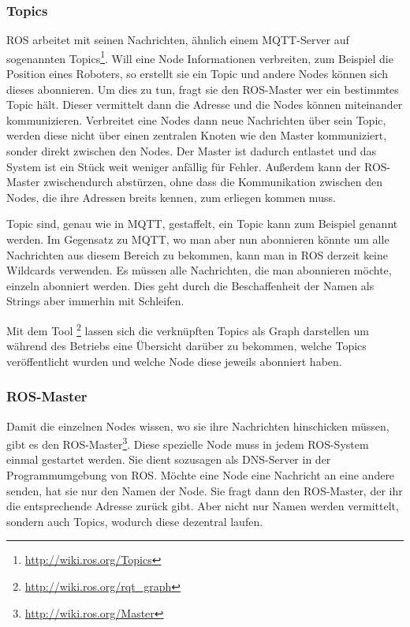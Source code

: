 \subsubsection*{Topics}
ROS arbeitet mit seinen Nachrichten, ähnlich einem MQTT-Server auf sogenannten Topics\footnote{\url{http://wiki.ros.org/Topics}}. Will eine Node Informationen verbreiten, zum Beispiel die Position eines Roboters, so erstellt sie ein Topic und andere Nodes können sich dieses abonnieren. Um dies zu tun, fragt sie den ROS-Master wer ein bestimmtes Topic hält. Dieser vermittelt dann die Adresse und die Nodes können miteinander kommunizieren. Verbreitet eine Nodes dann neue Nachrichten über sein Topic, werden diese nicht über einen zentralen Knoten wie den Master kommuniziert, sonder direkt zwischen den Nodes. Der Master ist dadurch entlastet und das System ist ein Stück weit weniger anfällig für Fehler. Außerdem kann der ROS-Master zwischendurch abstürzen, ohne dass die Kommunikation zwischen den Nodes, die ihre Adressen breits kennen, zum erliegen kommen muss.

Topic sind, genau wie in MQTT, gestaffelt, ein Topic kann zum Beispiel  genannt werden. Im Gegensatz zu MQTT, wo man aber nun  abonnieren könnte um alle Nachrichten aus diesem Bereich zu bekommen, kann man in ROS derzeit keine Wildcards verwenden. Es müssen alle Nachrichten, die man abonnieren möchte, einzeln abonniert werden. Dies geht durch die Beschaffenheit der Namen als Strings aber immerhin mit Schleifen.

Mit dem Tool \footnote{\url{http://wiki.ros.org/rqt_graph}} lassen sich die verknüpften Topics als Graph darstellen um während des Betriebs eine Übersicht darüber zu bekommen, welche Topics veröffentlicht wurden und welche Node diese jeweils abonniert haben.

\subsubsection*{ROS-Master}
Damit die einzelnen Nodes wissen, wo sie ihre Nachrichten hinschicken müssen, gibt es den ROS-Master\footnote{\url{http://wiki.ros.org/Master}}. Diese spezielle Node muss in jedem ROS-System einmal gestartet werden. Sie dient sozusagen als DNS-Server in der Programmumgebung von ROS. Möchte eine Node eine Nachricht an eine andere senden, hat sie nur den Namen der Node. Sie fragt dann den ROS-Master, der ihr die entsprechende Adresse zurück gibt. Aber nicht nur Namen werden vermittelt, sondern auch Topics, wodurch diese dezentral laufen.

